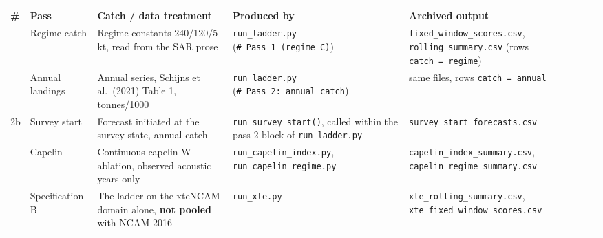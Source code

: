 \documentclass[11pt]{article}
\begin{document}
{\def\LTcaptype{none} %
\begin{longtable}[]{@{}
  >{\raggedright\arraybackslash}p{}
  >{\raggedright\arraybackslash}p{}
  >{\raggedright\arraybackslash}p{}
  >{\raggedright\arraybackslash}p{}
  >{\raggedright\arraybackslash}p{}@{}}
\toprule\noalign{}
\begin{minipage}[b]{\linewidth}\raggedright
\#
\end{minipage} & \begin{minipage}[b]{\linewidth}\raggedright
Pass
\end{minipage} & \begin{minipage}[b]{\linewidth}\raggedright
Catch / data treatment
\end{minipage} & \begin{minipage}[b]{\linewidth}\raggedright
Produced by
\end{minipage} & \begin{minipage}[b]{\linewidth}\raggedright
Archived output
\end{minipage} \\
\midrule\noalign{}
\endhead
\bottomrule\noalign{}
\endlastfoot
1 & Regime catch & Regime constants 240/120/5 kt, read from the SAR
prose & \texttt{run\_ladder.py} (\texttt{\#\ Pass\ 1\ (regime\ C)}) &
\texttt{fixed\_window\_scores.csv}, \texttt{rolling\_summary.csv} (rows
\texttt{catch\ =\ regime}) \\
2 & Annual landings & Annual series, Schijns et al.~(2021) Table 1,
tonnes/1000 & \texttt{run\_ladder.py}
(\texttt{\#\ Pass\ 2:\ annual\ catch}) & same files, rows
\texttt{catch\ =\ annual} \\
2b & Survey start & Forecast initiated at the survey state, annual catch
& \texttt{run\_survey\_start()}, called within the pass-2 block of
\texttt{run\_ladder.py} & \texttt{survey\_start\_forecasts.csv} \\
3 & Capelin & Continuous capelin-W ablation, observed acoustic years
only & \texttt{run\_capelin\_index.py}, \texttt{run\_capelin\_regime.py}
& \texttt{capelin\_index\_summary.csv},
\texttt{capelin\_regime\_summary.csv} \\
4 & Specification B & The ladder on the xteNCAM domain alone,
\textbf{not pooled} with NCAM 2016 & \texttt{run\_xte.py} &
\texttt{xte\_rolling\_summary.csv},
\texttt{xte\_fixed\_window\_scores.csv} \\
\end{longtable}
}
\end{document}
